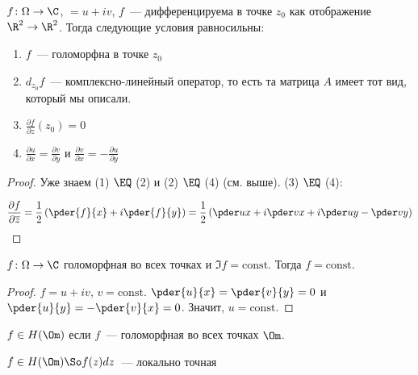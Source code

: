 \begin{theorem}
    $f\colon \Omega \to \C$, $ = u + iv$,
    $f$~--- дифференцируема в точке $z_0$
    как отображение $\R^2 \to \R^2$.
    Тогда следующие условия равносильны:

    \begin{enumerate}
        \item $f$~--- голоморфна в точке $z_0$
        \item $d_{z_0}f$~--- комплексно-линейный оператор, то есть та матрица
              $A$ имеет тот вид, который мы описали.
        \item $\frac{\partial f}{\partial \overline{z}}(z_0) = 0$
        \item $\frac{\partial u}{\partial x} = \frac{\partial v}{\partial y}$
              и $\frac{\partial v}{\partial x} = -\frac{\partial u}{\partial y}$
    \end{enumerate}
\end{theorem}

\begin{proof}
    Уже знаем (1) $\EQ$ (2) и (2) $\EQ$ (4) (см. выше).
    (3) $\EQ$ (4):

    \[
        \frac{\partial f}{\partial \overline{z}}
        = \frac{1}{2}\left(\pder{f}{x} + i\pder{f}{y}\right)
        = \frac{1}{2}\left(\pder u x + i\pder v x + i\pder u y - \pder v y\right)
    \]
\end{proof}

\begin{consequence}
    $f\colon\Omega \to \C$ голоморфная во всех точках
    и $\Im f = \mathrm{const}$. Тогда $f = \mathrm{const}$.
\end{consequence}

\begin{proof}
    $f = u + iv$, $v = \mathrm{const}$.
    $\pder{u}{x} = \pder{v}{y} = 0$
    и $\pder{u}{y} = -\pder{v}{x} = 0$.
    Значит, $u = \mathrm{const}$.
\end{proof}

\begin{notation}
    $f \in H(\Om)$ если $f$~--- голоморфная во всех точках $\Om$.
\end{notation}

\begin{theorem}[Коши]

    $f \in H(\Om) \So f(z)dz$~--- локально точная
\end{theorem}

